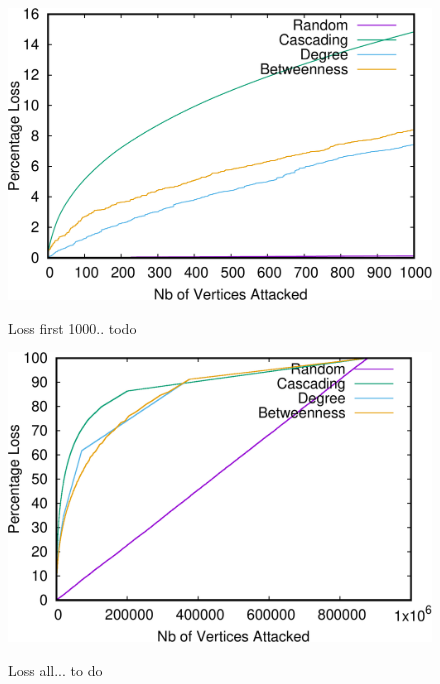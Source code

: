 \begin{figure}
\centering
\includegraphics[scale=0.35]{bench/loss-1000-crop.pdf}
\label{fig:loss-1000}
\caption{Loss first 1000.. todo}
\end{figure}

\begin{figure}
\centering
\includegraphics[scale=0.35]{bench/loss-all-crop.pdf}
\label{fig:loss-100}
\caption{Loss all... to do}
\end{figure}


